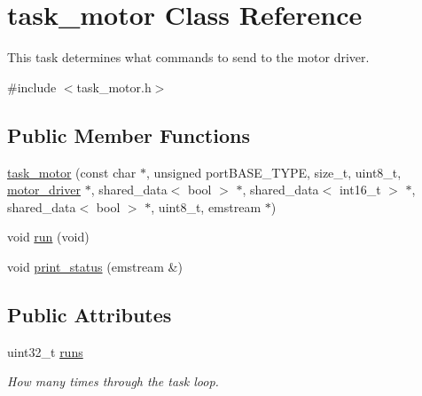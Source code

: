 \hypertarget{classtask__motor}{\section{task\-\_\-motor \-Class \-Reference}
\label{classtask__motor}
}


\-This task determines what commands to send to the motor driver.  




{\ttfamily \#include $<$task\-\_\-motor.\-h$>$}

\subsection*{\-Public \-Member \-Functions}
\begin{DoxyCompactItemize}
\item 
\hyperlink{classtask__motor_a94cd580f333660de457fdc5c2bd5702e}{task\-\_\-motor} (const char $\ast$, unsigned port\-B\-A\-S\-E\-\_\-\-T\-Y\-P\-E, size\-\_\-t, uint8\-\_\-t, \hyperlink{classmotor__driver}{motor\-\_\-driver} $\ast$, shared\-\_\-data$<$ bool $>$ $\ast$, shared\-\_\-data$<$ int16\-\_\-t $>$ $\ast$, shared\-\_\-data$<$ bool $>$ $\ast$, uint8\-\_\-t, emstream $\ast$)
\item 
void \hyperlink{classtask__motor_a895a075ec470c9d5a07b8959de06aacd}{run} (void)
\item 
void \hyperlink{classtask__motor_ae855a78d1ee432a797d401a9222c9955}{print\-\_\-status} (emstream \&)
\end{DoxyCompactItemize}
\subsection*{\-Public \-Attributes}
\begin{DoxyCompactItemize}
\item 
\hypertarget{classtask__motor_a54a068b1d4cb46dba17d3de8d17fc87c}{uint32\-\_\-t \hyperlink{classtask__motor_a54a068b1d4cb46dba17d3de8d17fc87c}{runs}}\label{classtask__motor_a54a068b1d4cb46dba17d3de8d17fc87c}

\begin{DoxyCompactList}\small\item\em \-How many times through the task loop. \end{DoxyCompactList}\end{DoxyCompactItemize}
